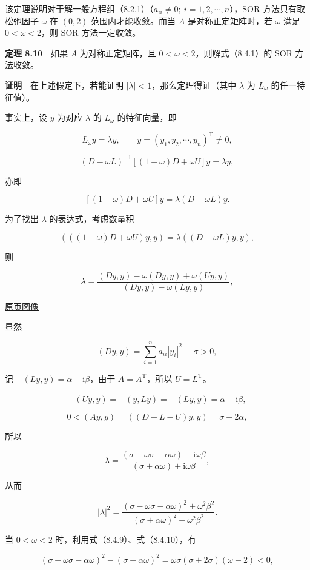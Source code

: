 \documentclass[
  10pt,
  fontset=fandol]{ctexart}
\begin{document}
该定理说明对于解一般方程组（8.2.1）（\(a_{ii}\neq0;\ i=1,2,\cdots,n\)），SOR 方法只有取松弛因子 \(\omega\) 在 \((0,2)\) 范围内才能收敛。而当 \(A\) 是对称正定矩阵时，若 \(\omega\) 满足 \(0<\omega<2\)，则 SOR 方法一定收敛。

\textbf{定理 8.10}　如果 \(A\) 为对称正定矩阵，且 \(0<\omega<2\)，则解式（8.4.1）的 SOR 方法收敛。

\textbf{证明}　在上述假定下，若能证明 \(|\lambda|<1\)，那么定理得证（其中 \(\lambda\) 为 \(L_\omega\) 的任一特征值）。

事实上，设 \(y\) 为对应 \(\lambda\) 的 \(L_\omega\) 的特征向量，即

\[
L_\omega y=\lambda y,\qquad y=(y_1,y_2,\cdots,y_n)^{\mathrm T}\neq0,
\]

\[
(D-\omega L)^{-1}[(1-\omega)D+\omega U]y=\lambda y,
\]

亦即

\[
[(1-\omega)D+\omega U]y=\lambda(D-\omega L)y.
\]

为了找出 \(\lambda\) 的表达式，考虑数量积

\[
(((1-\omega)D+\omega U)y,y)=\lambda((D-\omega L)y,y),
\]

则

\[
\lambda=\frac{(Dy,y)-\omega(Dy,y)+\omega(Uy,y)}{(Dy,y)-\omega(Ly,y)},
\]

\href{../../source-images/pdf-229.jpeg}{原页图像}

显然

\[
(Dy,y)=\sum_{i=1}^n a_{ii}|y_i|^2\equiv\sigma>0,
\tag{8.4.9}
\]

记 \(-(Ly,y)=\alpha+\mathrm i\beta\)，由于 \(A=A^{\mathrm T}\)，所以 \(U=L^{\mathrm T}\)。

\[
-(Uy,y)=-(y,Ly)=-\overline{(Ly,y)}=\alpha-\mathrm i\beta,
\]

\[
0<(Ay,y)=((D-L-U)y,y)=\sigma+2\alpha,
\tag{8.4.10}
\]

所以

\[
\lambda=\frac{(\sigma-\omega\sigma-\alpha\omega)+\mathrm i\omega\beta}{(\sigma+\alpha\omega)+\mathrm i\omega\beta},
\]

从而

\[
|\lambda|^2=\frac{(\sigma-\omega\sigma-\alpha\omega)^2+\omega^2\beta^2}{(\sigma+\alpha\omega)^2+\omega^2\beta^2}.
\]

当 \(0<\omega<2\) 时，利用式（8.4.9）、式（8.4.10），有

\[
(\sigma-\omega\sigma-\alpha\omega)^2-(\sigma+\alpha\omega)^2
=\omega\sigma(\sigma+2\sigma)(\omega-2)<0,
\]
\end{document}

